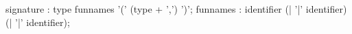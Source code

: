 \documentclass[11pt]{article}
\begin{document}
\begin{rail}
signature : type funnames '(' (type + ',') ')';
funnames : identifier (| '|' identifier) (| '|' identifier);
\end{rail}
\end{document}
